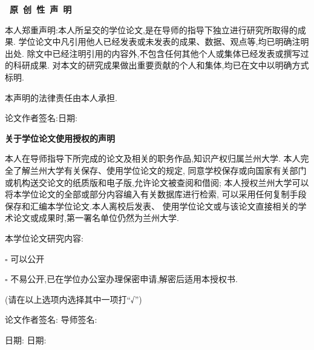 \thispagestyle{empty}
\fontsize{12pt}{20pt}\selectfont
\begin{center}\fontsize{15.75pt}{20pt}\selectfont
	{\bf \ 原\ 创\ 性\ 声\ 明 }
\end{center}

本人郑重声明:本人所呈交的学位论文,是在导师的指导下独立进行研究所取得的成果.
学位论文中凡引用他人已经发表或未发表的成果、数据、观点等,均已明确注明出处.
除文中已经注明引用的内容外,不包含任何其他个人或集体已经发表或撰写过的科研成果.
对本文的研究成果做出重要贡献的个人和集体,均已在文中以明确方式标明.

本声明的法律责任由本人承担.

\vspace{1cm}
{论文作者签名:\hrulefill \hspace{1em}日期:\hrulefill}


\vspace{2cm}
\begin{center}\fontsize{15.75pt}{20pt}\selectfont
	{\bf 关于学位论文使用授权的声明 }
\end{center}

本人在导师指导下所完成的论文及相关的职务作品,知识产权归属兰州大学.
本人完全了解兰州大学有关保存、使用学位论文的规定,
同意学校保存或向国家有关部门或机构送交论文的纸质版和电子版,允许论文被查阅和借阅;
本人授权兰州大学可以将本学位论文的全部或部分内容编入有关数据库进行检索,
可以采用任何复制手段保存和汇编本学位论文.本人离校后发表、
使用学位论文或与该论文直接相关的学术论文或成果时,第一署名单位仍然为兰州大学.

本学位论文研究内容:

$\square$ 可以公开

$\square$ 不易公开,已在学位办公室办理保密申请,解密后适用本授权书.

(请在以上选项内选择其中一项打“√”)


\vspace{1cm} {论文作者签名:\hrulefill
	\hspace{1em}导师签名:\hrulefill\hspace{1em}
	
	日\hspace{1.7cm}期:\hrulefill\hspace{1em}
	日\hspace{0.75cm}期:\hrulefill\hspace{1em}}
\newpage
